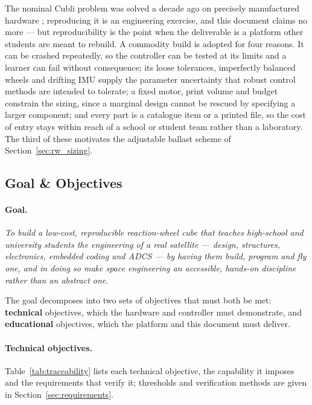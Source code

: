 The nominal Cubli problem was solved a decade ago on precisely manufactured hardware \cite{gajamohan2012cubli, gajamohan2013cubli, muehlebach2017cubli}; reproducing it is an engineering exercise, and this document claims no more --- but reproducibility is the point when the deliverable is a platform other students are meant to rebuild. A commodity build is adopted for four reasons. It can be crashed repeatedly, so the controller can be tested at its limits and a learner can fail without consequence; its loose tolerances, imperfectly balanced wheels and drifting IMU supply the parameter uncertainty that robust control methods are intended to tolerate; a fixed motor, print volume and budget constrain the sizing, since a marginal design cannot be rescued by specifying a larger component; and every part is a catalogue item or a printed file, so the cost of entry stays within reach of a school or student team rather than a laboratory. The third of these motivates the adjustable ballast scheme of Section~\ref{sec:rw_sizing}.

\subsection{Goal \& Objectives}
\label{sec:objectives}

\paragraph{Goal.} \emph{To build a low-cost, reproducible reaction-wheel cube
that teaches high-school and university students the engineering of a real
satellite --- design, structures, electronics, embedded coding and ADCS --- by
having them build, program and fly one, and in doing so make space engineering
an accessible, hands-on discipline rather than an abstract one.}

The goal decomposes into two sets of objectives that must both be met:
\textbf{technical} objectives, which the hardware and controller must
demonstrate, and \textbf{educational} objectives, which the platform and this
document must deliver.

\paragraph{Technical objectives.} Table~\ref{tab:traceability} lists each
technical objective, the capability it imposes and the requirements that verify
it; thresholds and verification methods are given in
Section~\ref{sec:requirements}.

